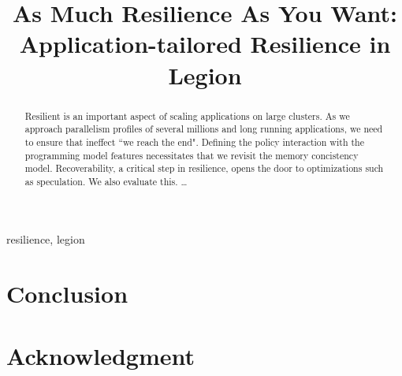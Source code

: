 \documentclass[conference]{IEEEtran}
\begin{document}
\title{As Much Resilience As You Want: \\Application-tailored Resilience in Legion}


\maketitle

\begin{abstract}
Resilient is an important aspect of scaling applications on
large clusters. As we approach parallelism profiles of several millions and long running applications, we need to ensure that ineffect ``we reach the end".
Defining the policy interaction with the programming model features necessitates that we revisit the memory concistency model. 
Recoverability, a critical step in
resilience, opens the door to optimizations such as speculation. We also
evaluate this.  \dots
\end{abstract}

\begin{IEEEkeywords}
resilience, legion
\end{IEEEkeywords}

















\section{Conclusion}

\section*{Acknowledgment}
\end{document}
